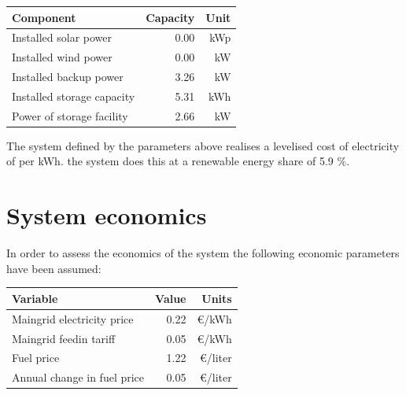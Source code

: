 \documentclass{article}
\begin{document}
\begin{multicols*}{2}
\begin{center}

\begin{tabular}{|l|r|r|}

\hline Component&Capacity&Unit\\ \hline 

Installed solar power&0.00&kWp\\ 

Installed wind power&0.00&kW\\ 

Installed backup power&3.26&kW\\ 

Installed storage capacity&5.31&kWh\\ 

Power of storage facility&2.66&kW\\ 

\hline

\end{tabular}

\label{tab:systemlayout}

\end{center}\vspace{0.5mm}

The system defined by the parameters above realises a levelised cost of electricity of  per kWh. the system does this at a renewable energy share of 5.9 \%. 

\section*{System economics}

In order to assess the economics of the system the following economic parameters have been assumed: 

\begin{center}

\begin{tabular}{|l|r|r|}

\hline Variable&Value&Units\\ \hline 

Maingrid electricity price&0.22&\euro /kWh\\ 

Maingrid feedin tariff&0.05&\euro /kWh\\ 

Fuel price&1.22&\euro /liter\\ 

Annual change in fuel price&0.05&\euro /liter\\ 


\end{tabular}
\end{center}
\end{multicols*}
\end{document}
